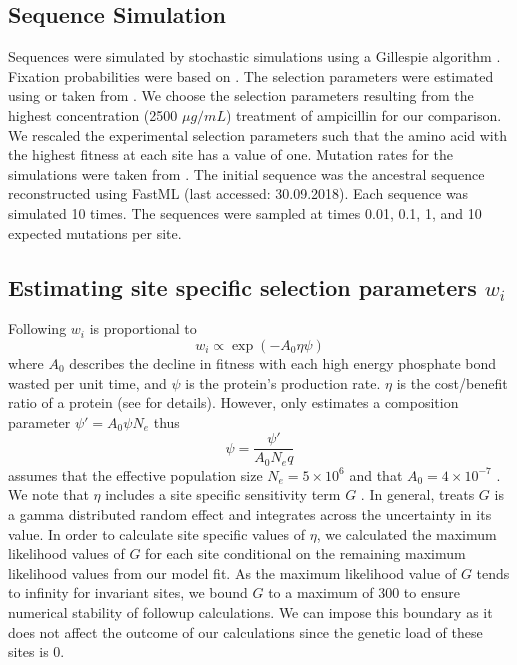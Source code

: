 \subsection{Sequence Simulation}

Sequences were simulated by stochastic simulations using a Gillespie algorithm \citep{gillespie1976}.
Fixation probabilities were based on \citet{SellaAndHirsh2005}.
The selection parameters were estimated using \selac or taken from \citet{stiffler2016}.
We choose the selection parameters resulting from the highest concentration (2500 $\mu g/mL$) treatment of ampicillin for our comparison.
We rescaled the experimental selection parameters such that the amino acid with the highest fitness at each site has a value of one.
Mutation rates for the simulations were taken from \selac.
The initial sequence was the ancestral sequence reconstructed using FastML \citep{fastml} (last accessed: 30.09.2018).
Each sequence was simulated 10 times. %
The sequences were sampled at times 0.01, 0.1, 1, and 10 expected mutations per site.

\subsection{Estimating site specific selection parameters $w_i$}

Following \citet{beaulieu2019} $w_i$ is proportional to
\begin{equation}
w_i \propto \exp(-A_0\eta\psi)
\end{equation}
where $A_0$ describes the decline in fitness with each high energy phosphate bond wasted per unit time, and $\psi$ is the protein's production rate.
$\eta$ is the cost/benefit ratio of a protein (see \citep{beaulieu2019} for details). 
However, \selac only estimates a composition parameter $\psi' = A_0\psi N_e$ thus
\begin{equation}
\psi = \frac{\psi'}{A_0N_eq}
\end{equation}
\selac assumes that the effective population size $N_e = 5\times 10^6$ and that $A_0 = 4 \times 10^{-7}$ \citep{gilchrist2007}.
We note that $\eta$ includes a site specific sensitivity term $G$ \citep{beaulieu2019}.
In general, \selac treats $G$ is a gamma distributed random effect and integrates across the uncertainty in its value.
In order to calculate site specific values of $\eta$, we calculated the maximum likelihood values of $G$ for each site conditional on the remaining maximum likelihood values from our \selac model fit.
As the maximum likelihood value of $G$ tends to infinity for invariant sites, we bound $G$ to a maximum of 300 to ensure numerical stability of followup calculations.
We can impose this boundary as it does not affect the outcome of our calculations since the genetic load of these sites is 0.
